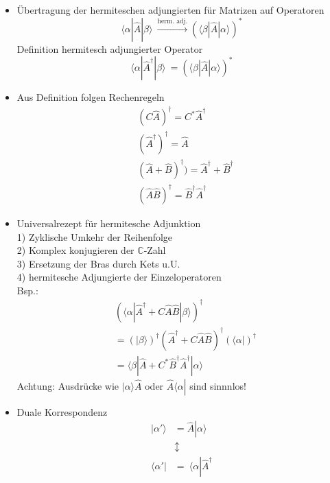 \documentclass[10pt,article,colorback,accentcolor=tud9d]{scrartcl}
\begin{document}
\begin{itemize}
\item Übertragung der hermiteschen adjungierten für Matrizen auf Operatoren
  \begin{equation}
  \langle \alpha\left|\right.\hat{A}\left|\right.\beta\rangle  \ \xrightarrow{\text{herm. adj.}} (\langle 
\beta \left|\right.\hat{A}\left|\right.\alpha\rangle )^*
  \end{equation}
  Definition hermitesch adjungierter Operator
  \begin{equation}
  \langle \alpha\left|\right.{\hat{A}}^{\dagger} \left|\right. \beta\rangle  \ =(\langle \beta\left|\right.
\hat{A}\left|\right.\alpha\rangle )^*
  \end{equation}
\item Aus Definition folgen Rechenregeln
  \begin{equation}
  \begin{aligned}
  &(C\hat{A})^{\dagger}=C^*{\hat{A}}^{\dagger}\\
  &({\hat{A}}^{\dagger})^{\dagger}=\hat{A}\\
  &(\hat{A} + \hat{B})^{\dagger} )= \hat{A}^{\dagger} + \hat{B}^{\dagger}\\
  &(\hat{A}\hat{B})^{\dagger}=\hat{B}^{\dagger}\hat{A}^{\dagger}
  \end{aligned}
  \end{equation}
\item  Universalrezept für hermitesche Adjunktion\\
  1) Zyklische Umkehr der Reihenfolge\\
  2) Komplex konjugieren der $\mathbb{C}$-Zahl\\
  3) Ersetzung der Bras durch Kets u.U.\\
  4) hermitesche Adjungierte der Einzeloperatoren\\
  Bsp.:
  \begin{equation}
  \begin{aligned}
  &(\langle \alpha\left|\right.\hat{A}^{\dagger}+C\hat{A}\hat{B}\left|\right.\beta\rangle )^{\dagger}\\
  &= (\left|\right.\beta\rangle )^{\dagger} (\hat{A}^{\dagger}+C\hat{A}\hat{B})^{\dagger}(\langle \alpha\left|\right
.)^{\dagger}\\
  &= \langle \beta\left|\right. \hat{A} +C^*\hat{B}^{\dagger} \hat{A}^{\dagger} \left|\right.\alpha\rangle 
  \end{aligned}
  \end{equation}
  Achtung: Ausdrücke wie $|\alpha\rangle \hat{A}$ oder $ \hat{A}\langle \alpha\left|\right.$ 
sind sinnnlos!
\item Duale Korrespondenz
  \begin{equation}
  \begin{aligned}
  \left|\right.\alpha'\rangle &=\hat{A}\left|\right.\alpha\rangle \\
    &\updownarrow\\
  \langle \alpha'\left|\right.&= \ \langle \alpha\left|\right.\hat{A}^{\dagger}
  \end{aligned}
  \end{equation}
\end{itemize}
\end{document}
